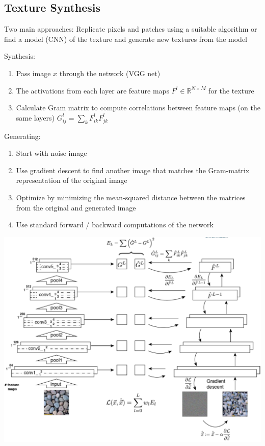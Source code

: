 \subsection{Texture Synthesis}
Two main approaches: Replicate pixels and patches using a suitable algorithm or find a model (CNN) of the texture and generate new textures from the model

\begin{minipage}{0.4\textwidth}
    Synthesis:
    \begin{enumerate}
        \item Pass image $x$ through the network (VGG net)
        \item The activations from each layer are feature maps $F^l \in \mathbb{R}^{N\times M}$ for the texture
        \item Calculate Gram matrix to compute correlations between feature maps (on the same layers) $G_{ij}^l = \sum_k F_{ik}^l F_{jk}^l$
    \end{enumerate}
    Generating:
    \begin{enumerate}
        \item Start with noise image
        \item Use gradient descent to find another image that matches the Gram-matrix representation of the original image
        \item Optimize by minimizing the mean-squared distance between the matrices from the original and generated image
        \item Use standard forward / backward computations of the network
    \end{enumerate}
\end{minipage}
\begin{minipage}{0.6\textwidth}
    \includegraphics[width=\textwidth]{sections/GeneratingImages/img/generate_textures.png}
\end{minipage}

